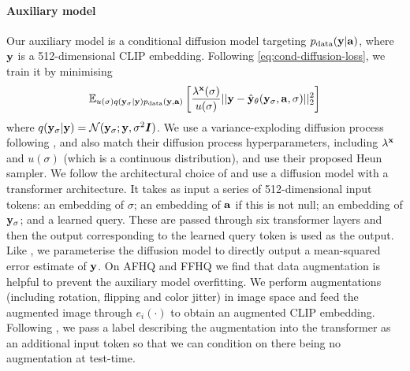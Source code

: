\paragraph{Auxiliary model}
Our auxiliary model is a conditional diffusion model targeting $p_{\rm{data}}({\mathbf{y}}|{\mathbf{a}})$, where ${\mathbf{y}}$ is a 512-dimensional CLIP embedding. Following \cref{eq:cond-diffusion-loss}, we train it by minimising
\begin{equation}
\label{eq:auxiliary-model-objective}
    \mathbb{E}_{u(\sigma)q({\mathbf{y}}_\sigma|{\mathbf{y}})p_{\rm{data}}({\mathbf{y}},{\mathbf{a}})} \left[ \frac{\lambda^{\mathbf{x}}(\sigma)}{u(\sigma)} \lvert\lvert {\mathbf{y}} - \hat{{\mathbf{y}}}_\theta({\mathbf{y}}_\sigma, {\mathbf{a}}, \sigma) \rvert\rvert_2^2 \right]
\end{equation}
where $q({\mathbf{y}}_\sigma|{\mathbf{y}}) = {\mathcal{N}}({\mathbf{y}}_\sigma; {\mathbf{y}}, \sigma^2{\bm{I}})$. We use a variance-exploding diffusion process following \citet{karras2022elucidating}, and also match their diffusion process hyperparameters, including $\lambda^{\mathbf{x}}$ and $u(\sigma)$ (which is a continuous distribution), and use their proposed Heun sampler. We follow the architectural choice of \citet{ramesh2022hierarchical} and use a diffusion model with a transformer architecture. It takes as input a series of 512-dimensional input tokens: an embedding of $\sigma$; an embedding of ${\mathbf{a}}$ if this is not null; an embedding of ${\mathbf{y}}_\sigma$; and a learned query. These are passed through six transformer layers and then the output corresponding to the learned query token is used as the output. Like \citet{ramesh2022hierarchical}, we parameterise the diffusion model to directly output a mean-squared error estimate of ${\mathbf{y}}$.
%
On AFHQ and FFHQ we find that data augmentation is helpful to prevent the auxiliary model overfitting. We perform augmentations (including rotation, flipping and color jitter) in image space and feed the augmented image through $e_i(\cdot)$ to obtain an augmented CLIP embedding. Following \citet{karras2022elucidating}, we pass a label describing the augmentation into the transformer as an additional input token so that we can condition on there being no augmentation at test-time.


